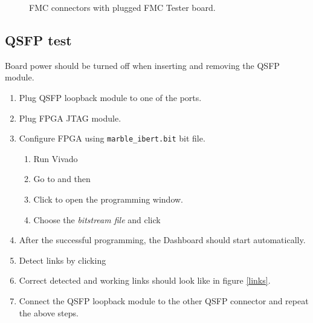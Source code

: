 \documentclass[12pt,oneside,a4]{article}
\begin{document}
\begin{figure}[H]%
    \centering
    \qquad
    \caption{FMC connectors with plugged FMC Tester board.}%
    \label{fig:example}%
\end{figure}

\subsection{QSFP test}

\begin{leftbar}
Board power should be turned off when inserting and removing the QSFP module.
\end{leftbar}
\begin{enumerate}
	\item Plug QSFP loopback module to one of the ports.
	\item Plug FPGA JTAG module.
	\item Configure FPGA using \texttt{marble\_ibert.bit} bit file.
	\begin{enumerate}
		\item Run Vivado
		\item Go to  and then  
		\item Click  to open the programming window. 
		\item Choose the \textit{bitstream file} and click 
	\end{enumerate}
	\item After the successful programming, the Dashboard should start automatically.
	\item Detect links by clicking 
	\item Correct detected and working links should look like in figure \ref{links}.  
	\item Connect the QSFP loopback module to the other QSFP connector and repeat the above steps.
\end{enumerate}
\end{document}
